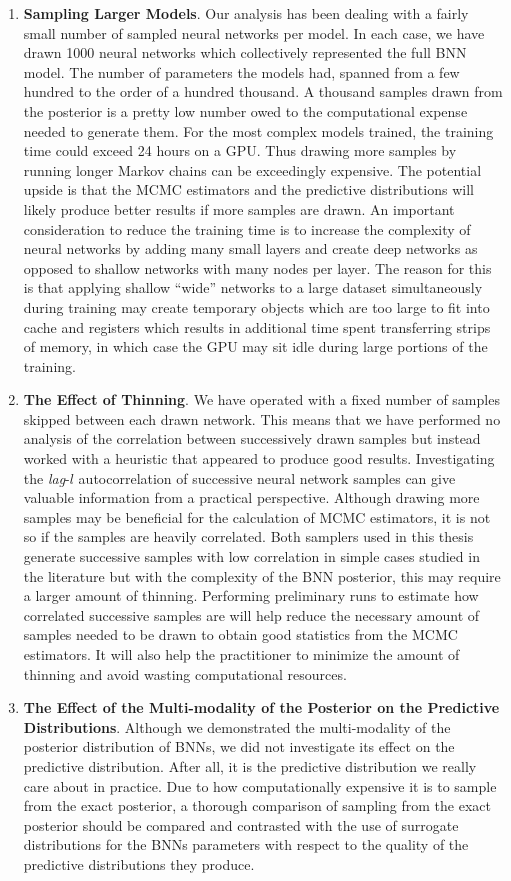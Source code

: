 \begin{enumerate}
    \item \textbf{Sampling Larger Models}. Our analysis has been dealing with a fairly small number of sampled neural networks per model. In each case, we have drawn 1000 neural networks which collectively represented the full BNN model. The number of parameters the models had, spanned from a few hundred to the order of a hundred thousand. A thousand samples drawn from the posterior is a pretty low number owed to the computational expense needed to generate them. For the most complex models trained, the training time could exceed 24 hours on a GPU. Thus drawing more samples by running longer Markov chains can be exceedingly expensive. The potential upside is that the MCMC estimators and the predictive distributions will likely produce better results if more samples are drawn. An important consideration to reduce the training time is to increase the complexity of neural networks by adding many small layers and create deep networks as opposed to shallow networks with many nodes per layer. The reason for this is that applying shallow ``wide'' networks to a large dataset simultaneously during training may create temporary objects which are too large to fit into cache and registers which results in additional time spent transferring strips of memory, in which case the GPU may sit idle during large portions of the training.
    \item \textbf{The Effect of Thinning}. We have operated with a fixed number of samples skipped between each drawn network. This means that we have performed no analysis of the correlation between successively drawn samples but instead worked with a heuristic that appeared to produce good results. Investigating the \textit{lag}-$l$ autocorrelation of successive neural network samples can give valuable information from a practical perspective. Although drawing more samples may be beneficial for the calculation of MCMC estimators, it is not so if the samples are heavily correlated. Both samplers used in this thesis generate successive samples with low correlation in simple cases studied in the literature \cite{nuts,neal2011} but with the complexity of the BNN posterior, this may require a larger amount of thinning. Performing preliminary runs to estimate how correlated successive samples are will help reduce the necessary amount of samples needed to be drawn to obtain good statistics from the MCMC estimators. It will also help the practitioner to minimize the amount of thinning and avoid wasting computational resources.
    \item \textbf{The Effect of the Multi-modality of the Posterior on the Predictive Distributions}. Although we demonstrated the multi-modality of the posterior distribution of BNNs, we did not investigate its effect on the predictive distribution. After all, it is the predictive distribution we really care about in practice. Due to how computationally expensive it is to sample from the exact posterior, a thorough comparison of sampling from the exact posterior should be compared and contrasted with the use of surrogate distributions for the BNNs parameters with respect to the quality of the predictive distributions they produce.

\end{enumerate}

